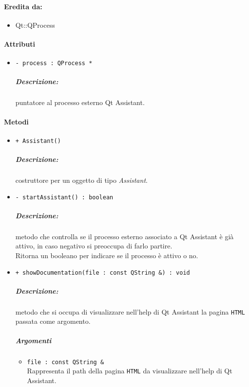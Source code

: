 	\paragraph{Eredita da:}
		\begin{itemize}
			\item Qt::QProcess
		\end{itemize}
	
	\paragraph{\color{black}Attributi \\}
		\begin{itemize}
			\item \color{teal} \verb!- process : QProcess *!\\
				   	\color{black}
				   	\subparagraph{Descrizione:} puntatore al processo esterno Qt Assistant.
		\end{itemize}
		
	\paragraph{\color{black}Metodi\\}
		\begin{itemize}
			\item \color{blue} \verb!+ Assistant()!\\
							 \color{black}
							 \subparagraph{Descrizione:} costruttore per un oggetto di tipo \textsl{Assistant}.
							 
			\item  \color{blue} \verb!- startAssistant() : boolean!\\
					\color{black}
					\subparagraph{Descrizione:} metodo che controlla se il processo esterno associato a Qt Assistant è già attivo, in caso negativo si preoccupa di farlo partire. 
					\\Ritorna un booleano per indicare se il processo è attivo o no.
					
			\item \color{blue} \verb!+ showDocumentation(file : const QString &) : void!\\
					 \color{black}
					 \subparagraph{Descrizione:} metodo che si occupa di visualizzare nell'help di Qt Assistant la pagina \verb!HTML! passata come argomento.\\
					 \subparagraph{Argomenti}
						\begin{itemize}
							\item \color{RoyalPurple} \verb!file : const QString &!\\
							\color{black}Rappresenta il path della pagina \verb!HTML! da visualizzare nell'help di Qt Assistant.
						\end{itemize}
		\end{itemize}
	
	
